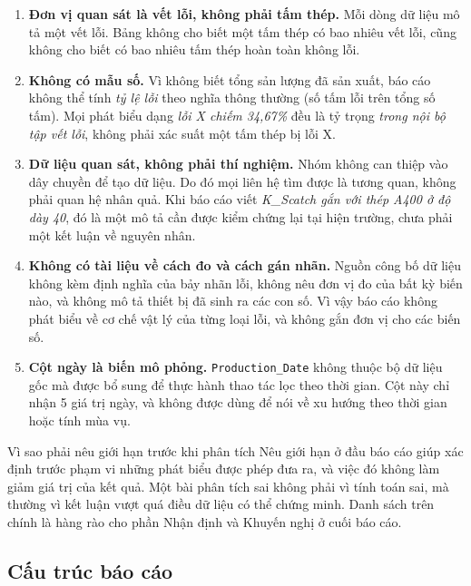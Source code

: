 \documentclass[12pt]{article}
\begin{document}
\begin{enumerate}
  \item \textbf{Đơn vị quan sát là vết lỗi, không phải tấm thép.} Mỗi dòng dữ liệu mô tả một vết lỗi. Bảng không cho biết một tấm thép có bao nhiêu vết lỗi, cũng không cho biết có bao nhiêu tấm thép hoàn toàn không lỗi.
  \item \textbf{Không có mẫu số.} Vì không biết tổng sản lượng đã sản xuất, báo cáo không thể tính \emph{tỷ lệ lỗi} theo nghĩa thông thường (số tấm lỗi trên tổng số tấm). Mọi phát biểu dạng \emph{lỗi X chiếm 34,67\%} đều là tỷ trọng \emph{trong nội bộ tập vết lỗi}, không phải xác suất một tấm thép bị lỗi X.
  \item \textbf{Dữ liệu quan sát, không phải thí nghiệm.} Nhóm không can thiệp vào dây chuyền để tạo dữ liệu. Do đó mọi liên hệ tìm được là tương quan, không phải quan hệ nhân quả. Khi báo cáo viết \emph{K\_Scatch gắn với thép A400 ở độ dày 40}, đó là một mô tả cần được kiểm chứng lại tại hiện trường, chưa phải một kết luận về nguyên nhân.
  \item \textbf{Không có tài liệu về cách đo và cách gán nhãn.} Nguồn công bố dữ liệu không kèm định nghĩa của bảy nhãn lỗi, không nêu đơn vị đo của bất kỳ biến nào, và không mô tả thiết bị đã sinh ra các con số. Vì vậy báo cáo không phát biểu về cơ chế vật lý của từng loại lỗi, và không gắn đơn vị cho các biến số.
  \item \textbf{Cột ngày là biến mô phỏng.} \texttt{Production\_Date} không thuộc bộ dữ liệu gốc mà được bổ sung để thực hành thao tác lọc theo thời gian. Cột này chỉ nhận 5 giá trị ngày, và không được dùng để nói về xu hướng theo thời gian hoặc tính mùa vụ.
\end{enumerate}

\begin{guidelinebox}{Vì sao phải nêu giới hạn trước khi phân tích}
Nêu giới hạn ở đầu báo cáo giúp xác định trước phạm vi những phát biểu được phép đưa ra, và việc đó không làm giảm giá trị của kết quả. Một bài phân tích sai không phải vì tính toán sai, mà thường vì kết luận vượt quá điều dữ liệu có thể chứng minh. Danh sách trên chính là hàng rào cho phần Nhận định và Khuyến nghị ở cuối báo cáo.
\end{guidelinebox}

\subsection{Cấu trúc báo cáo}
\end{document}
